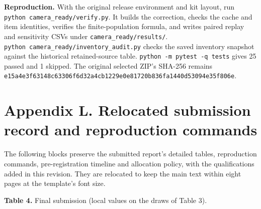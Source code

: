 \documentclass[
]{article}
\begin{document}
\textbf{Reproduction.} With the original release environment and kit
layout, run \texttt{python\ camera\_ready/verify.py}. It builds the
correction, checks the cache and item identities, verifies the
finite-population formula, and writes paired replay and sensitivity CSVs
under \texttt{camera\_ready/results/}.
\texttt{python\ camera\_ready/inventory\_audit.py} checks the saved
inventory snapshot against the historical retained-source table.
\texttt{python\ -m\ pytest\ -q\ tests} gives 25 passed and 1 skipped.
The original selected ZIP's SHA-256 remains
\texttt{e15a4e3f63148c63306f6d32a4cb1229e0e81720b836fa1440d53094e35f806e}.

\section{Appendix L. Relocated submission record and reproduction
commands}\label{appendix-l.-relocated-submission-record-and-reproduction-commands}

The following blocks preserve the submitted report's detailed tables,
reproduction commands, pre-registration timeline and allocation policy,
with the qualifications added in this revision. They are relocated to
keep the main text within eight pages at the template's font size.

\textbf{Table 4.} Final submission (local values on the draws of Table
3).
\end{document}
